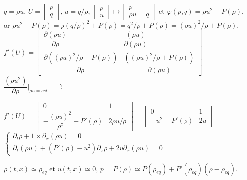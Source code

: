 \documentclass[12pt,a4paper]{article}
\begin{document}
	\begin{sol}
		$ $\\
		\begin{enumerate}
			\begin{minipage}{17cm}
			\item $q = \rho u$, $U = \begin{bmatrix}
					p \\
					q
				\end{bmatrix}$, $u = q/\rho$, $\begin{bmatrix}
				p \\
				u
				\end{bmatrix} \mapsto \begin{bmatrix}
				p \\
				\rho u = q
				\end{bmatrix}$ et $\varphi(p,q) = \rho u^2 + P(\rho)$,\\
				or $\rho u^2 + P(\rho) = \rho(q/\rho)^2 + P(\rho) = q^2/\rho + P(\rho) = (\rho u)^2/\rho + P(\rho) $.\\
				
				$f'(U) = \begin{bmatrix}
					\dfrac{\partial (\rho u)}{\partial\rho} & \dfrac{(\rho u)}{\partial (\rho u)}\\
					\dfrac{\partial\left((\rho u)^2/\rho + P(\rho)\right)}{\partial\rho} & \dfrac{\left((\rho u)^2/\rho + P(\rho)\right)}{\partial (\rho u)}
				\end{bmatrix}$ \hspace{1.5cm} $\dfrac{(\rho u^2)}{\partial \rho}\Big|_{\rho u = cst} = $ ?
				
				$f'(U) = \begin{bmatrix}
					0 & 1 \\
					-\dfrac{(\rho u)^2}{\rho^2} + P'(\rho) & 2\rho u /\rho
				\end{bmatrix} = \begin{bmatrix}
				0 & 1 \\
				-u^2 + P'(\rho) & 2u
				\end{bmatrix}$\\
				
				$\begin{cases}
					\partial_t\rho + 1\times\partial_x(\rho u) = 0 \\
					\partial_t (\rho u) + (P'(\rho)-u^2) \partial_x\rho + 2u\partial_x(\rho u) = 0
				\end{cases}$
			\end{minipage}
			
			\item \begin{minipage}[t]{17cm}
				$\rho(t,x) \simeq \rho_{eq}$ et $u(t,x) \simeq 0$, $p = P(\rho) \simeq P(\rho_{eq}) + P'(\rho_{eq})(\rho-\rho_{eq})$.\\
				

\end{minipage}
\end{enumerate}
\end{sol}
\end{document}
